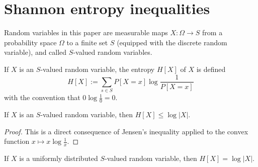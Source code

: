 \chapter{Shannon entropy inequalities}

Random variables in this paper are measurable maps $X : \Omega \to S$ from a probability space $\Omega$ to a finite set $S$ (equipped with the discrete random variable), and called $S$-valued random variables.

\begin{definition}[Entropy]
  \label{entropy-def}
  \leanok
  If $X$ is an $S$-valued random variable, the entropy $H[X]$ of $X$ is defined
  $$ H[X] := \sum_{s \in S} P[X=x] \log \frac{1}{P[X=x]}$$
  with the convention that $0 \log \frac{1}{0} = 0$.
\end{definition}

\begin{lemma}\label{jensen-bound}
\leanok
If $X$ is an $S$-valued random variable, then $H[X] \leq \log |X|$.
\end{lemma}

\begin{proof}
  This is a direct consequence of Jensen's inequality applied to the convex function $x \mapsto x \log \frac{1}{x}$.
\end{proof}

\begin{lemma}\label{uniform-entropy}
  \leanok
If $X$ is a uniformly distributed $S$-valued random variable, then $H[X] = \log |X|$.
\end{lemma}

